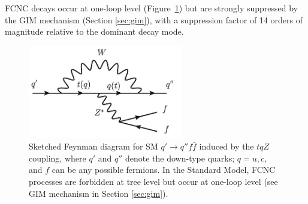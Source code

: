FCNC decays occur at one-loop level (Figure~\ref{fig:tqZ_fey}) but are strongly suppressed by the GIM mechanism (Section \ref{sec:gim}), with a suppression factor of 14 orders of
magnitude relative to the dominant decay mode\cite{tcZ_sm}.
\begin{figure}[!h]
	\centering
	\includegraphics[width=0.6\textwidth]{Chapters/CH1/figures/tqZ_fey}
	\caption{Sketched Feynman diagram for SM $q' \rightarrow q'' f \bar{f}$ induced by the $tqZ$ coupling, where $q'$ and $q''$ denote the down-type quarks; $q = u, c$, and $f$ can be any possible fermions. In the Standard Model, FCNC processes are forbidden at tree level but occur at one-loop level (see GIM mechanism in Section \ref{sec:gim}).}
	\label{fig:tqZ_fey}
\end{figure}

